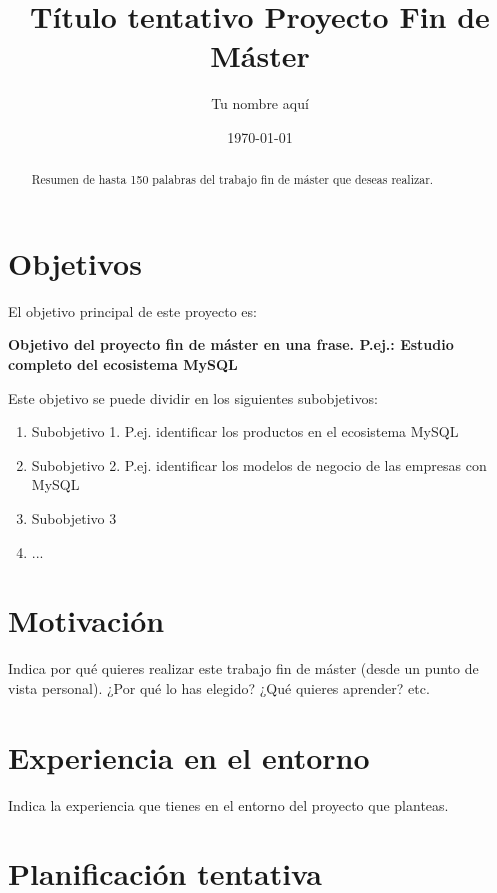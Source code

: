 \documentclass[10pt]{article}
\begin{document}
\title{Título tentativo Proyecto Fin de Máster}
\author{Tu nombre aquí}
\date{\today}


\maketitle

\begin{abstract}
Resumen de hasta 150 palabras del trabajo fin de máster que deseas realizar.
\end{abstract}

\section{Objetivos}

El objetivo principal de este proyecto es:

\begin{center}
\bf{Objetivo del proyecto fin de máster en una frase. P.ej.: Estudio completo del ecosistema MySQL}
\end{center}

Este objetivo se puede dividir en los siguientes subobjetivos:

\begin{enumerate}
  \item Subobjetivo 1. P.ej. identificar los productos en el ecosistema MySQL
  \item Subobjetivo 2. P.ej. identificar los modelos de negocio de las empresas con MySQL
  \item Subobjetivo 3
  \item ...
\end{enumerate}


\section{Motivación}

Indica por qué quieres realizar este trabajo fin de máster (desde un punto de vista personal). ¿Por qué lo has elegido? ¿Qué quieres aprender? etc.

\section{Experiencia en el entorno}

Indica la experiencia que tienes en el entorno del proyecto que planteas.

\section{Planificación tentativa}
\end{document}
